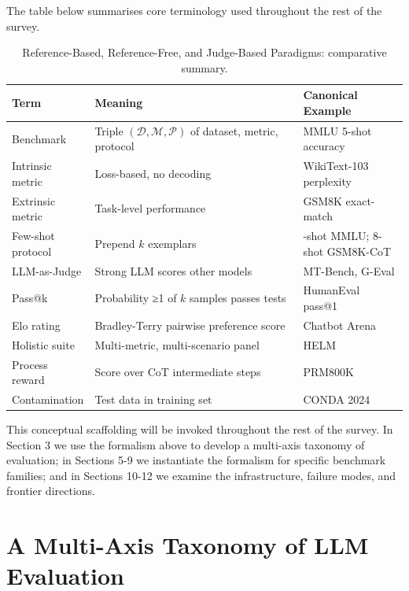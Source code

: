 \documentclass{article}
\begin{document}
The table below summarises core terminology used throughout the rest of the survey.

\begin{table}[t]
\centering
\caption{Reference-Based, Reference-Free, and Judge-Based Paradigms: comparative summary.}
\label{tab:reference-based-reference-free-and-judge-based-paradigms}
\begin{tabular}{>{\raggedright\arraybackslash}p{0.1288\linewidth}
  >{\raggedright\arraybackslash}p{0.5833\linewidth}
  >{\raggedright\arraybackslash}p{0.2879\linewidth}}
\toprule
Term & Meaning & Canonical Example \\
\midrule
Benchmark & Triple \((\mathcal{D}, \mathcal{M}, \mathcal{P})\) of dataset, metric, protocol & MMLU 5-shot accuracy \cite{hendrycks2021measuringmassivemu} \\
Intrinsic metric & Loss-based, no decoding & WikiText-103 perplexity \cite{touvron20232023} \\
Extrinsic metric & Task-level performance & GSM8K exact-match \cite{cobbe20212021} \\
Few-shot protocol & Prepend \(k\) exemplars & 5-shot MMLU; 8-shot GSM8K-CoT \\
LLM-as-Judge & Strong LLM scores other models & MT-Bench, G-Eval \cite{zheng20232023} \\
Pass@k & Probability ≥1 of \(k\) samples passes tests & HumanEval pass@1 \cite{chen20212021} \\
Elo rating & Bradley-Terry pairwise preference score & Chatbot Arena \cite{chiang20242024} \\
Holistic suite & Multi-metric, multi-scenario panel & HELM \cite{liang20222022} \\
Process reward & Score over CoT intermediate steps & PRM800K \cite{lightman20242024} \\
Contamination & Test data in training set & CONDA 2024 \cite{sainz20242024} \\
\end{tabular}
\end{table}

This conceptual scaffolding will be invoked throughout the rest of the survey. In Section 3 we use the formalism above to develop a multi-axis taxonomy of evaluation; in Sections 5-9 we instantiate the formalism for specific benchmark families; and in Sections 10-12 we examine the infrastructure, failure modes, and frontier directions.

\section{A Multi-Axis Taxonomy of LLM Evaluation}\label{a-multi-axis-taxonomy-of-llm-evaluation}
\end{document}
